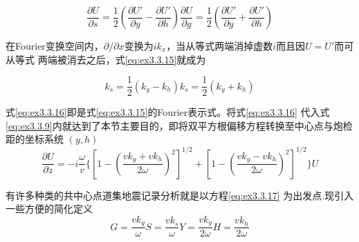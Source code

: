 \begin{subequations}
\begin{equation}
\frac{\partial U}{\partial s}=\frac{1}{2}(\frac{\partial U'}{\partial y}-\frac{\partial U'}{\partial h})
\label{eq:ex3.3.15a}
\end{equation}
\begin{equation}
\frac{\partial U}{\partial g}=\frac{1}{2}(\frac{\partial U'}{\partial y}+\frac{\partial U'}{\partial h})
\label{eq:ex3.3.15b}
\end{equation}
\label{eq:ex3.3.15}
\end{subequations}

在Fourier变换空间内，$\partial/\partial x$变换为$ik_x$，当从等式两端消掉虚数$i$而且因$U=U'$而可从等式
两端被消去之后，式\ref{eq:ex3.3.15}就成为

\begin{subequations}
\begin{equation}
k_s=\frac{1}{2}(k_y-k_h)
\label{eq:ex3.3.16a}
\end{equation}
\begin{equation}
k_s=\frac{1}{2}(k_y+k_h)
\label{eq:ex3.3.16b}
\end{equation}
\label{eq:ex3.3.16}
\end{subequations}

式\ref{eq:ex3.3.16}即是式\ref{eq:ex3.3.15}的Fourier表示式。将式\ref{eq:ex3.3.16}
代入式\ref{eq:ex3.3.9}内就达到了本节主要目的，即将双平方根偏移方程转换至中心点与炮检距的坐标系统
$(y,h)$
\begin{equation}
\frac{\partial U}{\partial z}=-i\frac{\omega}{v} \{
[1-(\frac{vk_y+vk_h}{2\omega})^2]^{1/2}+
[1-(\frac{vk_y-vk_h}{2\omega})^2]^{1/2}
\}U
\label{eq:ex3.3.17}
\end{equation}

有许多种类的共中心点道集地震记录分析就是以方程\ref{eq:ex3.3.17}
为出发点.现引入一些方便的简化定义
\begin{subequations}
\begin{equation}
G=\frac{vk_g}{\omega}
\label{eq:ex3.3.18a}
\end{equation}
\begin{equation}
S=\frac{vk_s}{\omega}
\label{eq:ex3.3.18b}
\end{equation}
\begin{equation}
Y=\frac{vk_y}{2\omega}
\label{eq:ex3.3.18c}
\end{equation}
\begin{equation}
H=\frac{vk_h}{2\omega}
\label{eq:ex3.3.18d}
\end{equation}
\label{eq:ex3.3.18}
\end{subequations}

